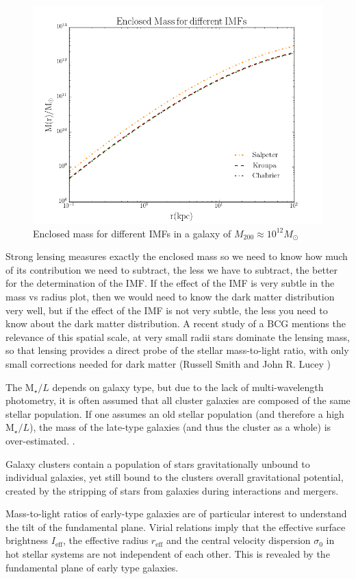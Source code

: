 \begin{figure}[H]
\centering
\includegraphics[width=12cm]{images/Enclosed_Mass_IMFs.png}
\caption[Enclosed mass for different IMFs in a galaxy]{Enclosed mass for different IMFs in a galaxy of $M_{200}\approx 10^{12} M_{\odot}$}
\end{figure}   

Strong lensing measures exactly the enclosed mass so we need to know how much of its contribution we need to subtract, the less we have to subtract, the better for the determination of the IMF. If the effect of the IMF is very subtle in the mass vs radius plot, then we would need to know the dark matter distribution very well, but if the effect of the IMF is not very subtle, the less you need to know about the dark matter distribution. A recent study of a BCG mentions the relevance of this spatial scale, at very small radii stars dominate the lensing mass, so that lensing provides a direct probe of the stellar mass-to-light ratio, with only small corrections needed for dark matter (Russell Smith and John R. Lucey \citeyear{Reference7}) 

The $\text{M}_{\star}/L$ depends on galaxy type, but due to the lack of multi-wavelength photometry, it is often assumed that all cluster galaxies are composed of the same stellar population. If one assumes an old stellar population (and therefore a high $\text{M}_{\star}/L$), the mass of the late-type galaxies (and thus the cluster as a whole) is over-estimated. \citeyear{Reference2}.

Galaxy clusters contain a population of stars gravitationally unbound to individual galaxies, yet still bound to the clusters overall gravitational potential, created by the stripping of stars from galaxies during interactions and mergers.

Mass-to-light ratios of early-type galaxies are of particular interest to understand the tilt of the fundamental plane. Virial relations imply that the effective surface brightness $I_{\text{eff}}$, the effective radius $r_{\text{eff}}$ and the central velocity dispersion $\sigma_{0}$ in hot stellar systems are not independent of each other. This is revealed by the fundamental plane of early type galaxies.